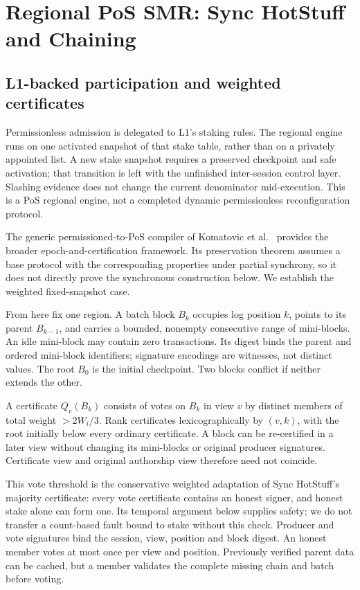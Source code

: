 \documentclass[11pt,a4paper,onecolumn]{article}
\newcounter{protocol}
\begin{document}
\section{Regional PoS SMR: Sync HotStuff and Chaining}\label{sec:protocol}
\subsection{L1-backed participation and weighted certificates}
Permissionless admission is delegated to L1's staking rules. The regional
engine runs on one activated snapshot of that stake table, rather than on a
privately appointed list. A new stake snapshot requires a preserved checkpoint
and safe activation; that transition is left with the unfinished inter-session
control layer. Slashing evidence does not change the current denominator
mid-execution. This is a PoS regional engine, not a completed dynamic
permissionless reconfiguration protocol.

The generic permissioned-to-PoS compiler of Komatovic et al.~\cite{poscompiler}
provides the broader epoch-and-certification framework. Its preservation
theorem assumes a base protocol with the corresponding properties under
partial synchrony, so it does not directly prove the synchronous construction
below. We establish the weighted fixed-snapshot case.

From here fix one region. A batch block $B_k$ occupies log position $k$,
points to its parent $B_{k-1}$, and carries a bounded, nonempty consecutive
range of mini-blocks. An idle mini-block may contain zero transactions.
Its digest binds the parent and ordered mini-block identifiers;
signature encodings are witnesses, not distinct values. The root $B_0$ is
the initial checkpoint. Two blocks conflict if neither extends the other.

A certificate $Q_v(B_k)$ consists of votes on $B_k$ in view $v$ by distinct
members of total weight $>2W_i/3$. Rank certificates lexicographically by
$(v,k)$, with the root initially below every ordinary certificate. A block
can be re-certified in a later view without changing its mini-blocks or
original producer signatures. Certificate view and original authorship view
therefore need not coincide.

This vote threshold is the conservative weighted adaptation of Sync HotStuff's
majority certificate: every vote certificate contains an honest signer, and honest
stake alone can form one. Its temporal argument below supplies safety;
we do not transfer a count-based fault bound to stake without this check.
Producer and vote signatures bind the session, view, position and block
digest. An honest member votes at most once per view and position.
Previously verified parent data can be cached, but a member validates the
complete missing chain and batch before voting.
\end{document}

